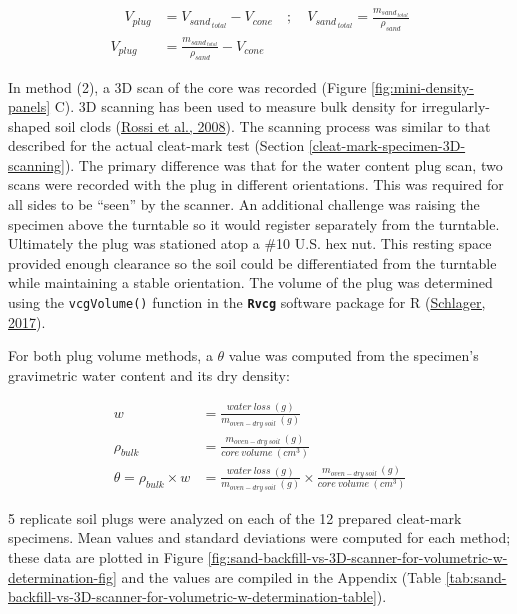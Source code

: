 \documentclass[
  letterpaper,
  openany]{book}
\begin{document}
\begin{align}
\quad V_{plug} &= V_{sand_{~total}} - V_{cone} \quad ; \quad V_{sand_{~total}} = \frac{m_{sand_{~total}}}{\rho_{sand}} \\
V_{plug} &= \frac{m_{sand_{~total}}}{\rho_{sand}} - V_{cone}
\label{eq:mini-density-sand-backfill-equation}
\end{align}

In method (2), a 3D scan of the core was recorded (Figure \ref{fig:mini-density-panels} C).
3D scanning has been used to measure bulk density for irregularly-shaped soil clods (\protect\hyperlink{ref-Rossi2008}{Rossi et al., 2008}). The scanning process was similar to that described for the actual cleat-mark test (Section \ref{cleat-mark-specimen-3D-scanning}).
The primary difference was that for the water content plug scan, two scans were recorded with the plug in different orientations.
This was required for all sides to be ``seen'' by the scanner.
An additional challenge was raising the specimen above the turntable so it would register separately from the turntable.
Ultimately the plug was stationed atop a \#10 U.S. hex nut. This resting space provided enough clearance so the soil could be differentiated from the turntable while maintaining a stable orientation.
The volume of the plug was determined using the \texttt{vcgVolume()} function in the \textbf{\texttt{Rvcg}} software package for R (\protect\hyperlink{ref-Schlager2017}{Schlager, 2017}).

For both plug volume methods, a \(\theta\) value was computed from the specimen's gravimetric water content and its dry density:

\begin{align}
w &= \frac{water~loss~(g)}{m_{oven-dry~soil}~(g)} \\
\rho_{bulk} &= \frac{m_{oven-dry~soil}~(g)}{core~volume~(cm^3)} \\
\theta  = \rho_{bulk} \times w &= \frac{water~loss~(g)}{m_{oven-dry~soil}~(g)} \times \frac{m_{oven-dry~soil}~(g)}{core~volume~(cm^3)}
\label{eq:vwc-equation} 
\end{align}

5 replicate soil plugs were analyzed on each of the 12 prepared cleat-mark specimens.
Mean values and standard deviations were computed for each method; these data are plotted in Figure \ref{fig:sand-backfill-vs-3D-scanner-for-volumetric-w-determination-fig} and the values are compiled in the Appendix (Table \ref{tab:sand-backfill-vs-3D-scanner-for-volumetric-w-determination-table}).
\end{document}
